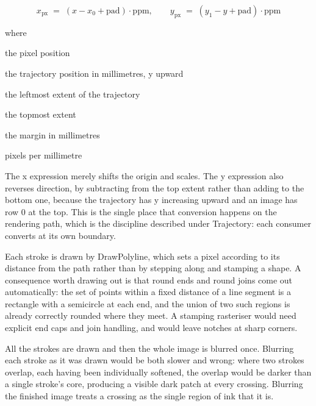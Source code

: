 
\begin{equation}
x_{\mathrm{px}} \;=\; (x - x_0 + \mathrm{pad}) \cdot \mathrm{ppm}, \qquad y_{\mathrm{px}} \;=\; (y_1 - y + \mathrm{pad}) \cdot \mathrm{ppm}
\end{equation}

\noindent where
\begin{description}[leftmargin=2.4em,style=nextline,font=\normalfont\ttfamily]\setlength\itemsep{1pt}
  \item[{$x_{\mathrm{px}},\, y_{\mathrm{px}}$}] \normalfont the pixel position
  \item[{$x,\,y$}] \normalfont the trajectory position in millimetres, y upward
  \item[{$x_0$}] \normalfont the leftmost extent of the trajectory
  \item[{$y_1$}] \normalfont the topmost extent
  \item[{$\mathrm{pad}$}] \normalfont the margin in millimetres
  \item[{$\mathrm{ppm}$}] \normalfont pixels per millimetre
\end{description}
The x expression merely shifts the origin and scales. The y expression also reverses direction, by subtracting from the top extent rather than adding to the bottom one, because the trajectory has y increasing upward and an image has row 0 at the top. This is the single place that conversion happens on the rendering path, which is the discipline described under Trajectory: each consumer converts at its own boundary.


Each stroke is drawn by DrawPolyline, which sets a pixel according to its distance from the path rather than by stepping along and stamping a shape. A consequence worth drawing out is that round ends and round joins come out automatically: the set of points within a fixed distance of a line segment is a rectangle with a semicircle at each end, and the union of two such regions is already correctly rounded where they meet. A stamping rasteriser would need explicit end caps and join handling, and would leave notches at sharp corners.


All the strokes are drawn and then the whole image is blurred once. Blurring each stroke as it was drawn would be both slower and wrong: where two strokes overlap, each having been individually softened, the overlap would be darker than a single stroke's core, producing a visible dark patch at every crossing. Blurring the finished image treats a crossing as the single region of ink that it is.


